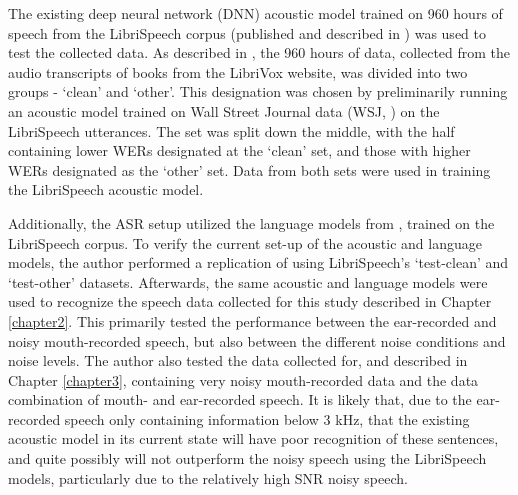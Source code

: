 The existing deep neural network (DNN) acoustic model trained on 960 hours of speech from the LibriSpeech corpus (published and described in \cite{panayotov:15}) was used to test the collected data.  As described in \cite{panayotov:15}, the 960 hours of data, collected from the audio transcripts of books from the LibriVox website, was divided into two groups - `clean' and `other'.  This designation was chosen by preliminarily running an acoustic model trained on Wall Street Journal data (WSJ, \cite{paul:92}) on the LibriSpeech utterances. The set was split down the middle, with the half containing lower WERs designated at the `clean' set, and those with higher WERs designated as the `other' set.  Data from both sets were used in training the LibriSpeech acoustic model.  \DIFaddbegin {}\DIFaddend 

Additionally, the ASR setup utilized the language models from \cite{panayotov:15}, trained on the LibriSpeech corpus.  To verify the current set-up of the acoustic and language models, the author performed a replication of \cite{panayotov:15} \DIFdelbegin {}\DIFdelend using LibriSpeech's `test-clean' and `test-other' datasets.  Afterwards, the same acoustic and language models were used to recognize the speech data collected for this study described in Chapter \ref{chapter2}. This primarily tested the performance between the ear-recorded and noisy mouth-recorded speech, but also between the different noise conditions and noise levels.  The author also tested the data collected for, and described in Chapter \ref{chapter3}, containing very noisy mouth-recorded data and the data combination of mouth- and ear-recorded speech.
It is likely that, due to the ear-recorded speech only containing information below 3 kHz, that the existing acoustic model in its current state will have poor recognition of these sentences, and quite possibly will not outperform the noisy speech using the LibriSpeech models, particularly due to the relatively high SNR noisy speech.

